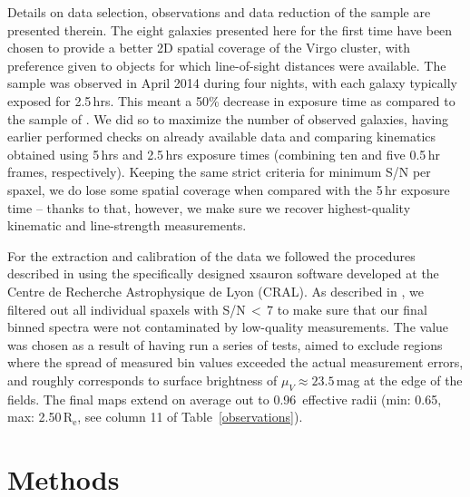 \documentclass[useAMS,usenatbib]{mn2e}
\newcommand{\re}{$\mathrm{R_e}$}
\begin{document}
Details on data selection, observations and data reduction of the \cite{rys:2013} sample are presented therein. The eight galaxies presented here for the first time have been chosen to provide a better 2D spatial coverage of the Virgo cluster, with preference given to objects for which line-of-sight distances were available. The sample was observed in April 2014 during four nights, with each galaxy typically exposed for 2.5\,hrs. This meant a 50\% decrease in exposure time as compared to the sample of \cite{rys:2013}. We did so to maximize the number of observed galaxies, having earlier performed checks on already available data and comparing kinematics obtained using 5\,hrs and 2.5\,hrs exposure times (combining ten and five 0.5\,hr frames, respectively). Keeping the same strict criteria for minimum S/N per spaxel, we do lose some spatial coverage when compared with the 5\,hr exposure time -- thanks to that, however, we make sure we recover highest-quality kinematic and line-strength measurements.

For the extraction and calibration of the data we followed the procedures described in \cite{bacon:2001} using the specifically designed {\sc xsauron} software developed at the Centre de Recherche Astrophysique de Lyon (CRAL). As described in \cite{rys:2013}, we filtered out all individual spaxels with S/N\,$<$\,7 to make sure that our final binned spectra were not contaminated by low-quality measurements. The value was chosen as a result of having run a series of tests, aimed to exclude regions where the spread of measured bin values exceeded the actual measurement errors, and roughly corresponds to surface brightness of $\mu_V\approx23.5$\,mag at the edge of the fields. The final maps extend on average out to 0.96~effective radii (min: 0.65, max: 2.50\,{\re}, see column 11 of Table~\ref{observations}).



\section{Methods}
\end{document}
